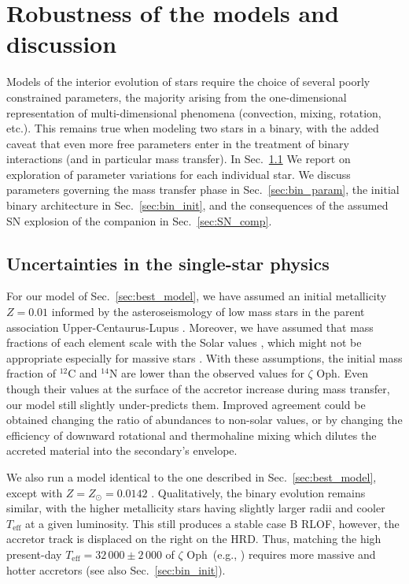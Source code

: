 \documentclass[twocolumn,twocolappendix,trackchanges]{aastex63}
\DeclareRobustCommand{\Secref}[1]{Sec.~\ref{#1}}
\newcommand{\zoph}{$\zeta$ Oph}
\begin{document}
\section{Robustness of the models and discussion}
\label{sec:discussion}

Models of the interior evolution of stars require the choice of
several poorly constrained parameters, the majority arising from the
one-dimensional representation of multi-dimensional phenomena
(convection, mixing, rotation, etc.). This remains true when modeling
two stars in a binary, with the added caveat that even more free
parameters enter in the treatment of binary interactions (and in
particular mass transfer). In \Secref{sec:single_star_uncertainties}
We report on exploration of parameter variations for each individual
star. We discuss parameters governing the mass transfer phase in
\Secref{sec:bin_param}, the initial binary architecture in
\Secref{sec:bin_init}, and the consequences of the assumed SN
explosion of the companion in \Secref{sec:SN_comp}.


\subsection{Uncertainties in the single-star physics}
\label{sec:single_star_uncertainties}

For our model of \Secref{sec:best_model}, we have assumed an initial
metallicity $Z=0.01$ informed by the asteroseismology of low mass
stars in the parent association Upper-Centaurus-Lupus \citep[e.g.,][]{murphy:21}. Moreover,
we have assumed that mass fractions of each element scale with the Solar values
\citep{grevesse:98}, which might not be appropriate especially for
massive stars \citep[e.g.,][]{grasha:21}. With these assumptions, the
initial mass fraction of $^{12}\mathrm{C}$ and $^{14}\mathrm{N}$ are
lower than the observed values for \zoph. Even though their values at
the surface of the accretor increase during mass transfer, our model
still slightly under-predicts them. Improved agreement could be
obtained changing the ratio of abundances to non-solar values, or by
changing the efficiency of downward rotational and thermohaline mixing
which dilutes the accreted material into the secondary's envelope.

We also run a model identical to the one described in
\Secref{sec:best_model}, except with $Z=Z_\odot=0.0142$
\citep{asplund:09}. Qualitatively, the binary evolution remains
similar, with the higher metallicity stars having slightly larger
radii and cooler $T_\mathrm{eff}$ at a given luminosity. This still
produces a stable case B RLOF, however, the accretor track is
displaced on the right on the HRD. Thus, matching the high present-day
$T_\mathrm{eff}=32\,000\pm2\,000$ of \zoph\ (e.g., ) requires more
massive and hotter accretors (see also \Secref{sec:bin_init}).
\end{document}
